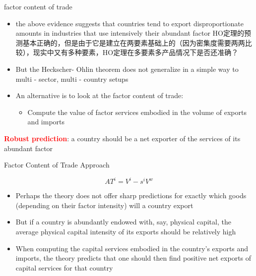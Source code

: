 \documentclass[10pt,hyperref={CJKbookmarks=true},xcolor=dvipsnames,aspectratio=169]{beamer}
\begin{document}
\begin{frame}{factor content of trade}



\begin{itemize}
\item the above evidence suggests that countries tend to export disproportionate
amounts in industries that use intensively their abundant factor HO定理的预测基本正确的，但是由于它是建立在两要素基础上的（因为密集度需要两两比较），现实中又有多种要素，HO定理在多要素多产品情况下是否还准确？
\item But the Heckscher- Ohlin theorem does not generalize in a simple way
to multi - sector, multi - country setups 
\item An alternative is to look at the factor content of trade: 

\begin{itemize}
\item Compute the value of factor services embodied in the volume of exports
and imports 
\end{itemize}
\end{itemize}
\begin{corollary}
\textbf{\textcolor{red}{Robust prediction}}: a country should be a
net exporter of the services of its abundant factor 
\end{corollary}

\end{frame}

\begin{frame}{Factor Content of Trade Approach }

	\begin{theorem}
		\begin{equation}
		AT^i=V^i-s^iV^w
		\end{equation}
	\end{theorem}
\begin{itemize}
\item Perhaps the theory does not offer sharp predictions for exactly which
goods (depending on their factor intensity) will a country export 
\item But if a country is abundantly endowed with, say, physical capital,
the average physical capital intensity of its exports should be relatively
high 
\item When computing the capital services embodied in the country’s exports
and imports, the theory predicts that one should then find positive
net exports of capital services for that country 
\end{itemize}
\end{frame}
\end{document}
